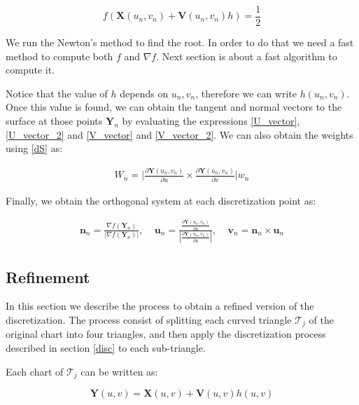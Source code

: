 \documentclass[11pt]{article}
\newcommand\bn{\boldsymbol n}
\newcommand\bX{\boldsymbol X}
\newcommand\bY{\boldsymbol Y}
\newcommand\bV{\boldsymbol V}
\newcommand\bu{\boldsymbol u}
\newcommand\bv{\boldsymbol v}
\begin{document}
\begin{equation}\label{newtoneq}
f(\bX(u_n,v_n)+\bV(u_n,v_n)h)=\frac{1}{2}
\end{equation}

We run the Newton's method to find the root. In order to do that we need a fast method to compute both $f$ and $\nabla f$. Next section is about a fast algorithm to compute it.

Notice that the value of $h$ depends on $u_n,v_n$, therefore we can write $h(u_n,v_n)$. Once this value is found, we can obtain the tangent and normal vectors to the surface at those points $\bY_n$ by evaluating the expressions \ref{U_vector}, \ref{U_vector_2} and \ref{V_vector} and \ref{V_vector_2}. We can also obtain the weights using \ref{dS} as:

\begin{equation}\label{dS_n}
\begin{aligned}
 W_n=\Bigg|\frac{\partial\bY(u_n,v_n)}{\partial u}\times\frac{\partial\bY(u_n,v_n)}{\partial v}\Bigg|w_n
\end{aligned}
\end{equation}

Finally, we obtain the orthogonal system at each discretization point as:

\begin{equation}
\begin{aligned}
\bn_n=\frac{\nabla f(\bY_n)}{|\nabla f(\bY_n)|},\  \  \  \   \ 
\bu_n=\frac{\frac{\partial\bY(u_n,v_n)}{\partial u}}{|\frac{\partial\bY(u_n,v_n)}{\partial u}|},\  \  \  \   \
\bv_n=\bn_n\times\bu_n
\end{aligned}
\end{equation}




\subsection{Refinement}

In this section we describe the process to obtain a refined version of the discretization. The process consist of splitting each curved triangle  $\mathcal{T}_j$ of the original chart into four triangles, and then apply the discretization process described in section \ref{disc} to each sub-triangle.

Each chart of $\mathcal{T}_j$ can be written as:

\begin{equation}
\bY(u,v)=\bX(u,v)+\bV(u,v)h(u,v)
\end{equation}
\end{document}
